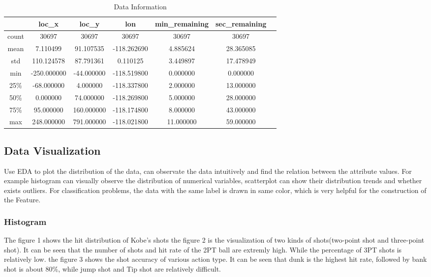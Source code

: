 \begin{table}[htbp]  \centering
	\caption{Data Information}
	\label{tbl:data information}		
	\begin{tabular}{ccccccc}
		\hline
		 & loc\_x & loc\_y & lon & min\_remaining & sec\_remaining \\
		\hline
		count & 30697 & 30697 & 30697 & 30697 & 30697  \\
		mean  & 7.110499	& 91.107535 & -118.262690 & 4.885624 & 28.365085\\
		std 	& 110.124578 & 87.791361 & 0.110125	& 3.449897 & 17.478949  \\
		min 	& -250.000000 & -44.000000 & -118.519800 & 0.000000	& 0.000000  \\
		25\%  & -68.000000 & 4.000000 & -118.337800 & 2.000000 & 13.000000\\
		50\%  & 0.000000	& 74.000000	& -118.269800	& 5.000000	& 28.000000	\\
		75\% & 95.000000 & 160.000000 & -118.174800 & 8.000000 & 43.000000 \\
		max  & 248.000000 & 791.000000 & -118.021800 & 11.000000 & 59.000000 \\
		\hline 
	\end{tabular}
\end{table}



\subsection{Data Visualization}

Use EDA to plot the distribution of the data,
can observate the data intuitively and
find the relation between the attribute values. 
For example histogram can visually observe 
the distribution of numerical variables, 
scatterplot can show their distribution trends 
and whether exists outliers.
For classification problems, 
the data with the same label is drawn in same color, 
which is very helpful for 
the construction of the Feature.



\subsubsection{ Histogram}

The figure 1
shows the hit distribution of Kobe's shots  
the figure 2
is the visualization of two kinds of shots(two-point shot and three-point shot).
It can be seen that the number of shots and hit rate of the 2PT ball are extremly high. 
While the percentage of 3PT shots is relatively low.
the figure 3 
shows the shot accuracy of various action type.
It can be seen that dunk is the highest hit rate, followed by bank shot is about 80\%,
while jump shot and Tip shot are relatively difficult.
\newpage

